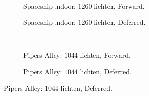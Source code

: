 \begin{figure}[t]
\begin{subfigure}[b]{\textwidth}
  \end{subfigure}\hfill\\
  \begin{adjustbox}{minipage=\textwidth, scale=0.55}
    \begin{subfigure}[b]{0.8\textwidth}
      \centering
      \def\svgwidth{\textwidth}
      
      \caption{Spaceship indoor: $1260$ lichten, Forward.}
      \label{fig:ts-resolution-forward:indoor}
    \end{subfigure}
  \end{adjustbox}\hspace{-0.075\textwidth} %
  \begin{adjustbox}{minipage=\textwidth, scale=0.55}
    \begin{subfigure}[b]{0.8\textwidth}
      \centering
      \def\svgwidth{\textwidth}
      
      \caption{Spaceship indoor: $1260$ lichten, Deferred.}
      \label{fig:ts-resolution-deferred:indoor}
    \end{subfigure}
  \end{adjustbox} \\
  \begin{adjustbox}{minipage=\textwidth, scale=0.55}
    \begin{subfigure}[b]{0.8\textwidth}
      \centering
      \def\svgwidth{\textwidth}
      
      \caption{Pipers Alley: $1044$ lichten, Forward.}
      \label{fig:ts-resolution-forward:alley}
    \end{subfigure}
  \end{adjustbox}\hspace{-0.075\textwidth} %
  \begin{adjustbox}{minipage=\textwidth, scale=0.55}
    \begin{subfigure}[b]{0.8\textwidth}
      \centering
      \def\svgwidth{\textwidth}
      
      \caption{Pipers Alley: $1044$ lichten, Deferred.}

\end{subfigure}
\end{adjustbox}
\end{figure}

